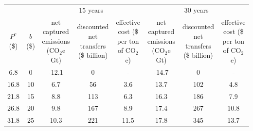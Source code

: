 \begin{tabular}{cccccccc}
\toprule
&& \multicolumn{3}{c}{15 years} & \multicolumn{3}{c}{30 years} \\
\cmidrule[1pt](r){3-5} \cmidrule[1pt](r){6-8}
\makecell[c]{$P^e$ \\ (\$)} & \makecell[c]{$b$ \\ (\$)} & \makecell[c]{net captured \\ emissions \\ (CO$_2$e Gt)} & \makecell[c]{discounted \\ net transfers \\  (\$ billion)} & \makecell[c]{  effective cost \\ (\$ per ton \\ of CO$_2$e)} & \makecell[c]{net captured \\ emissions \\ (CO$_2$e Gt)} & \makecell[c]{discounted \\ net transfers \\ (\$ billion)} & \makecell[c]{  effective cost \\ (\$ per ton \\ of CO$_2$e)} \\
\midrule

6.8 & 0 & -12.1 & 0 & - & -14.7 & 0 & - \\
16.8 & 10 & 6.7 & 56 & 3.6 & 13.7 & 102 & 4.8 \\
21.8 & 15 & 8.8 & 113 & 6.3 & 16.3 & 186 & 7.9 \\
26.8 & 20 & 9.8 & 167 & 8.9 & 17.4 & 267 & 10.8 \\
31.8 & 25 & 10.3 & 221 & 11.5 & 17.8 & 345 & 13.7 \\
\bottomrule
\end{tabular}
